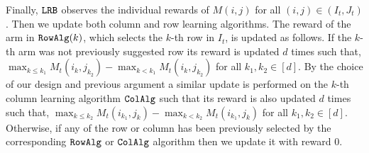 Finally, ${\tt LRB}$ observes the individual rewards of $M(i,j)$ for all $(i,j)\in (I_t, J_t)$. Then we update both column and row learning algorithms. The reward of the arm in ${\tt RowAlg}(k)$, which selects the $k$-th row in $I_t$, is updated as follows. If the $k$-th arm was not previously suggested row its reward is updated $d$ times such that, $\max_{k \leq k_1} M_t(i_k, j_{k_2}) - \max_{k < k_1} M_t(i_k, j_{k_2})$ for all $k_1,k_2 \in [d]$. By the choice of our design and previous argument a similar update is performed on the $k$-th column learning algorithm ${\tt ColAlg}$ such that its reward is also updated $d$ times such that, $\max_{k \leq k_2} M_t(i_{k_1}, j_k)  - \max_{k < k_2} M_t(i_{k_1}, j_k)$ for all $k_1,k_2 \in [d]$. Otherwise, if any of the row or column has been previously selected by the corresponding ${\tt RowAlg}$ or ${\tt ColAlg}$ algorithm then we update it with reward $0$.





